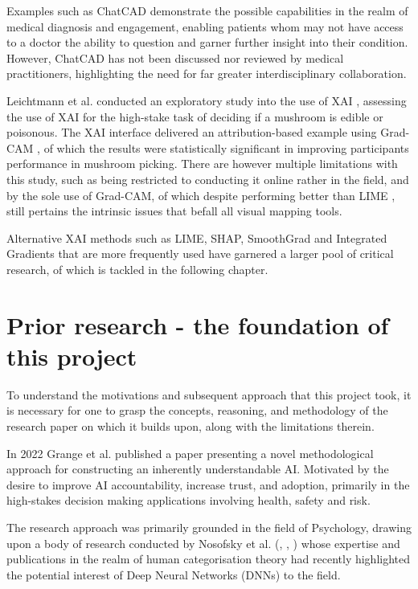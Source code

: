 Examples such as ChatCAD \cite{wangChatCADInteractiveComputerAided2023} demonstrate the possible capabilities in the realm of medical diagnosis and engagement, enabling patients whom may not have access to a doctor the ability to question and garner further insight into their condition. However, ChatCAD has not been discussed nor reviewed by medical practitioners, highlighting the need for far greater interdisciplinary collaboration. 

Leichtmann et al. conducted an exploratory study into the use of XAI \cite{leichtmannEffectsExplainableArtificial2023}, assessing the use of XAI for the high-stake task of deciding if a mushroom is edible or poisonous. The XAI interface delivered an attribution-based example using Grad-CAM \cite{selvarajuGradCAMVisualExplanations2017}, of which the results were statistically significant in improving participants performance in mushroom picking. There are however multiple limitations with this study, such as being restricted to conducting it online rather in the field, and by the sole use of Grad-CAM, of which despite performing better than  LIME \cite{ribeiroWhyShouldTrust2016}, still pertains the intrinsic issues that befall all visual mapping tools.

Alternative XAI methods such as LIME, SHAP, SmoothGrad and Integrated Gradients that are more frequently used have garnered a larger pool of critical research, of which is tackled in the following chapter.

\section{Prior research - the foundation of this project}

To understand the motivations and subsequent approach that this project took, it is necessary for one to grasp the concepts, reasoning, and methodology of the research paper on which it builds upon, along with the limitations therein.

In 2022 Grange et al. \cite{grangeXAISelfexplanatoryAI2022} published a paper presenting a novel methodological approach for constructing an inherently understandable AI. Motivated by the desire to improve AI accountability, increase trust, and adoption, primarily in the high-stakes decision making applications involving health, safety and risk. 

The research approach was primarily grounded in the field of Psychology, drawing upon a body of research conducted by Nosofsky et al. (\cite{sandersTrainingDeepNetworks2020}, \cite{nosofskyTestsExemplarmemoryModel2018}, \cite{miyatsuFeatureHighlightingEnhances2019}) whose expertise and publications in the realm of human categorisation theory had recently highlighted the potential interest of Deep Neural Networks (DNNs) to the field.

